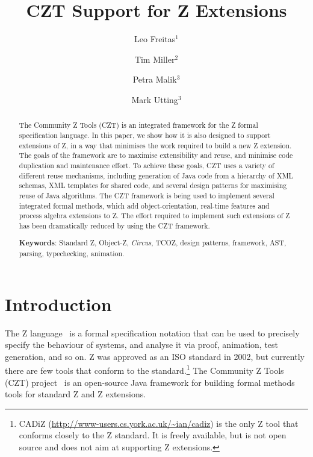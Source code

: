 \documentclass{llncs}
\newcommand{\Circus}{{\sf\slshape Circus}}
\begin{document}
\title{CZT Support for Z Extensions}
\author{Leo Freitas$^1$ \and Tim Miller$^2$ \and Petra Malik$^3$ \and Mark Utting$^3$}


\maketitle


\begin{abstract}
  The Community Z Tools (CZT) is an integrated
  framework for the Z formal specification language.  In this
  paper, we show how it is also designed to support extensions
  of Z, in a way that minimises the work required to build a
  new Z extension.  The goals of the framework are to maximise
  extensibility and reuse, and minimise code duplication and
  maintenance effort.  To achieve these goals, CZT uses a variety of
  different reuse mechanisms, including generation of Java
  code from a hierarchy of XML schemas, XML templates for shared
  code, and several design patterns for maximising reuse of Java
  algorithms.
  The CZT framework is being used to implement several integrated
  formal methods, which add object-orientation, real-time features
  and process algebra extensions to Z.  The effort required to
  implement such extensions of Z has been dramatically reduced
  by using the CZT framework.

  \noindent
  \textbf{Keywords}: Standard Z, Object-Z, \Circus, TCOZ, design patterns,
     framework, AST, parsing, typechecking, animation.
\end{abstract}

\section{Introduction} \label{sec:intro}

  The Z language~\cite{isoz} is a formal specification notation that
  can be used to precisely specify the behaviour of systems, and
  analyse it via proof, animation, test generation, and so on.
  Z was approved as an ISO standard in 2002, but currently there are few
  tools that conform to the standard.\footnote{CADiZ
  (\url{http://www-users.cs.york.ac.uk/~ian/cadiz}) is the only Z tool
  that conforms closely to the Z standard.  It is freely available,
  but is not open source and does not aim at supporting Z extensions.}
  The Community Z Tools (CZT) project~\cite{czt} is an open-source Java
  framework for building formal methods tools for standard Z and Z extensions.
\end{document}
